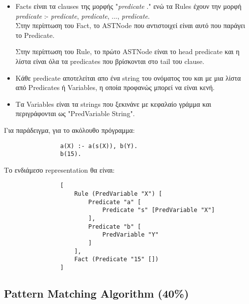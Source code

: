 \documentclass[10pt]{article}
\begin{document}
\begin{itemize}

\item Facts είναι τα clauses της μορφής "\textit{predicate} ." ενώ τα Rules έχουν την μορφή\\


\textit{predicate}  :- \textit{predicate}, \textit{predicate}, ..., \textit{predicate}.\\ 



Στην περίπτωση του Fact, το ASTNode που αντιστοιχεί είναι αυτό που παράγει το Predicate. 

Στην περίπτωση του Rule, το πρώτο ASTNode είναι το head predicate και η λίστα είναι όλα τα predicates που βρίσκονται στο tail του clause.

\item Κάθε predicate αποτελείται απο ένα string του ονόματος του και με μια λίστα από Predicates ή Variables, η οποία προφανώς μπορεί να είναι κενή.

\item Τα Variables είναι τα strings που ξεκινάνε με κεφαλαίο γράμμα και περιγράφονται ως "PredVariable String".

\end{itemize}

Για παράδειγμα, για το ακόλουθο πρόγραμμα:


\begin{verbatim}
                a(X) :- a(s(X)), b(Y).
                b(15).
\end{verbatim}

Το ενδιάμεσο representation θα είναι:

\begin{verbatim}
                [
                    Rule (PredVariable "X") [
                        Predicate "a" [
                            Predicate "s" [PredVariable "X"]
                        ],
                        Predicate "b" [
                            PredVariable "Y"
                        ]
                    ],
                    Fact (Predicate "15" [])
                ]

\end{verbatim}



\subsection*{Pattern Matching Algorithm (40\%)}
\end{document}
